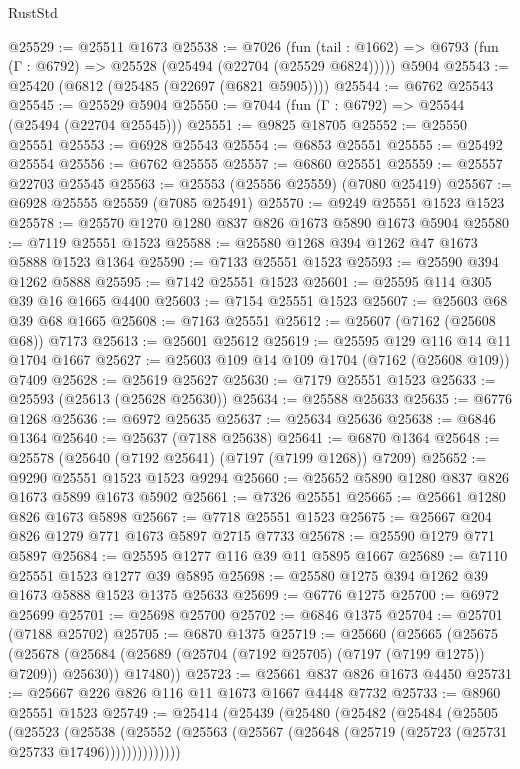 \begin{lexlean}{RustStd}
\begin{coremodule}
@25529 := @25511 @1673
@25538 := @7026
    (fun (tail : @1662) => @6793 (fun (Γ : @6792) => @25528 (@25494 (@22704 (@25529 @6824)))))
    @5904
@25543 := @25420 (@6812 (@25485 (@22697 (@6821 @5905))))
@25544 := @6762 @25543
@25545 := @25529 @5904
@25550 := @7044 (fun (Γ : @6792) => @25544 (@25494 (@22704 @25545)))
@25551 := @9825 @18705
@25552 := @25550 @25551
@25553 := @6928 @25543
@25554 := @6853 @25551
@25555 := @25492 @25554
@25556 := @6762 @25555
@25557 := @6860 @25551
@25559 := @25557 @22703 @25545
@25563 := @25553 (@25556 @25559) (@7080 @25419)
@25567 := @6928 @25555 @25559 (@7085 @25491)
@25570 := @9249 @25551 @1523 @1523
@25578 := @25570 @1270 @1280 @837 @826 @1673 @5890 @1673 @5904
@25580 := @7119 @25551 @1523
@25588 := @25580 @1268 @394 @1262 @47 @1673 @5888 @1523 @1364
@25590 := @7133 @25551 @1523
@25593 := @25590 @394 @1262 @5888
@25595 := @7142 @25551 @1523
@25601 := @25595 @114 @305 @39 @16 @1665 @4400
@25603 := @7154 @25551 @1523
@25607 := @25603 @68 @39 @68 @1665
@25608 := @7163 @25551
@25612 := @25607 (@7162 (@25608 @68)) @7173
@25613 := @25601 @25612
@25619 := @25595 @129 @116 @14 @11 @1704 @1667
@25627 := @25603 @109 @14 @109 @1704 (@7162 (@25608 @109)) @7409
@25628 := @25619 @25627
@25630 := @7179 @25551 @1523
@25633 := @25593 (@25613 (@25628 @25630))
@25634 := @25588 @25633
@25635 := @6776 @1268
@25636 := @6972 @25635
@25637 := @25634 @25636
@25638 := @6846 @1364
@25640 := @25637 (@7188 @25638)
@25641 := @6870 @1364
@25648 := @25578 (@25640 (@7192 @25641) (@7197 (@7199 @1268)) @7209)
@25652 := @9290 @25551 @1523 @1523 @9294
@25660 := @25652 @5890 @1280 @837 @826 @1673 @5899 @1673 @5902
@25661 := @7326 @25551
@25665 := @25661 @1280 @826 @1673 @5898
@25667 := @7718 @25551 @1523
@25675 := @25667 @204 @826 @1279 @771 @1673 @5897 @2715 @7733
@25678 := @25590 @1279 @771 @5897
@25684 := @25595 @1277 @116 @39 @11 @5895 @1667
@25689 := @7110 @25551 @1523 @1277 @39 @5895
@25698 := @25580 @1275 @394 @1262 @39 @1673 @5888 @1523 @1375 @25633
@25699 := @6776 @1275
@25700 := @6972 @25699
@25701 := @25698 @25700
@25702 := @6846 @1375
@25704 := @25701 (@7188 @25702)
@25705 := @6870 @1375
@25719 := @25660
    (@25665
      (@25675
        (@25678 (@25684 (@25689 (@25704 (@7192 @25705) (@7197 (@7199 @1275)) @7209)) @25630))
        @17480))
@25723 := @25661 @837 @826 @1673 @4450
@25731 := @25667 @226 @826 @116 @11 @1673 @1667 @4448 @7732
@25733 := @8960 @25551 @1523
@25749 := @25414
    (@25439
      (@25480
        (@25482
          (@25484
            (@25505
              (@25523
                (@25538
                  (@25552
                    (@25563 (@25567 (@25648 (@25719 (@25723 (@25731 @25733 @17496))))))))))))))

\end{coremodule}
\end{lexlean}
